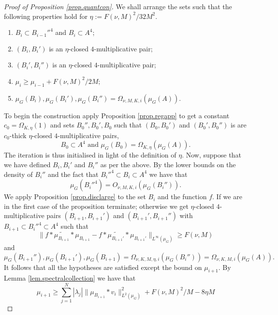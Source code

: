 \documentclass[12pt]{amsart}
\numberwithin{equation}{section}
\theoremstyle{plain}
\theoremstyle{definition}
\renewcommand{\geq}{\geqslant}
\begin{document}
\begin{proof}[Proof of Proposition \ref{prop.quantcon}]
We shall arrange the sets such that the following properties hold for $\eta:=F(\nu,M)^2/32M^2$.
\begin{enumerate}
\item $B_i \subset B_{i-1}''^4$ and $B_i \subset A^4$;
\item $(B_i,B_{i}')$ is an $\eta$-closed $4$-multiplicative pair;
\item $(B_i',B_{i}'')$ is an $\eta$-closed $4$-multiplicative pair;
\item $\mu_i \geq \mu_{i-1}+F(\nu,M)^2/2M$;
\item $\mu_G(B_i),\mu_G(B_i'),\mu_G(B_i'') = \Omega_{\nu,M,K,i}(\mu_G(A))$.
\end{enumerate}
To begin the construction apply Proposition \ref{prop.regapp} to get a constant $c_0=\Omega_{K,\eta}(1)$ and sets $B_0'',B_0',B_0$ such that $(B_0,B_0')$ and $(B_0',B_0'')$ is are $c_0$-thick $\eta$-closed $4$-multiplicative pairs,
\begin{equation*}
B_0 \subset A^4 \textrm{ and } \mu_G(B_0)= \Omega_{K,\eta}(\mu_G(A)).
\end{equation*}
The iteration is thus initialised in light of the definition of $\eta$.  Now, suppose that we have defined $B_i,B_i'$ and $B_i''$ as per the above. By the lower bounds on the density of $B_i''$ and the fact that $B_i''^4 \subset B_i \subset A^4$ we have that
\begin{equation*}
\mu_G(B_i''^4) =O_{\nu,M,K,i}(\mu_G(B_i'')).
\end{equation*}
We apply Proposition \ref{prop.disclarge} to the set $B_i$ and the function $f$.  If we are in the first case of the proposition terminate; otherwise we get $\eta$-closed $4$-multiplicative pairs $(B_{i+1},B_{i+1}')$ and $(B_{i+1}',B_{i+1}'')$ with $B_{i+1}\subset B_{i}''^4\subset A^4$ such that
\begin{equation*}
\|f \ast \widetilde{\mu_{B_{i+1}}}\ast  \mu_{B_{i+1}} - f \ast \widetilde{\mu_{B_{i+1}'}}\ast  \mu_{B_{i+1}'}\|_{L^\infty(\mu_G)}\geq F(\nu,M)
\end{equation*}
and
\begin{equation*}
\mu_G(B_{i+1}''),\mu_G(B_{i+1}'),\mu_G(B_{i+1}) = \Omega_{\nu,K,M,\eta,i}(\mu_G(B_i'')) =  \Omega_{\nu,K,M,i}(\mu_G(A)).
\end{equation*}
It follows that all the hypotheses are satisfied except the bound on $\mu_{i+1}$.  By Lemma \ref{lem.spectralcollection} we have that
\begin{equation*}
\mu_{i+1} \geq \sum_{j=1}^N{|\lambda_j|\|\mu_{B_{i+1}} \ast v_i\|_{L^2(\mu_G)}^2} + F(\nu,M)^2/M - 8\eta M

\end{equation*}
\end{proof}
\end{document}
